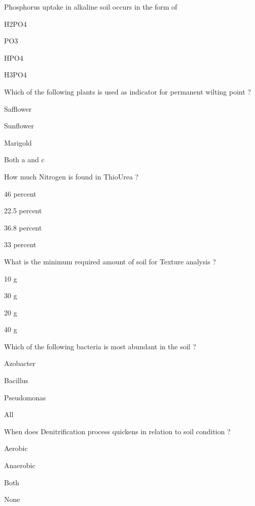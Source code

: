 \begin{questions}
\question Phosphorus uptake in alkaline soil occurs in the form of
\begin{items}
\item H2PO4
\item PO3
\item* HPO4
\item H3PO4
\end{items}

\question Which of the following plants is used as indicator for permanent wilting point ?
\begin{items}
\item Safflower
\item* Sunflower
\item Marigold
\item Both a and c
\end{items}

\question How much Nitrogen is found in ThioUrea ?
\begin{items}
\item 46 percent
\item 22.5 percent
\item 36.8 percent
\item 33 percent
\end{items}

\question What is the minimum required amount of soil for Texture analysis ?
\begin{items}
\item 10 g
\item 30 g
\item 20 g
\item 40 g
\end{items}

\question Which of the following bacteria is most abundant in the soil ?
\begin{items}
\item Azobacter
\item Bacillus
\item Pseudomonas
\item All
\end{items}

\question When does Denitrification process quickens in relation to soil condition ?
\begin{items}
\item Aerobic
\item Anaerobic
\item Both
\item None
\end{items}


\end{questions}
